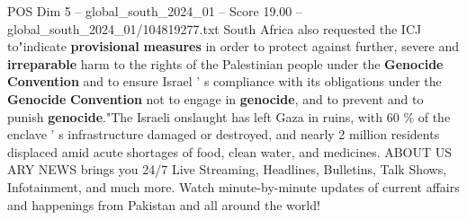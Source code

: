 \begin{textsample}{POS Dim 5 – global\_south\_2024\_01 – Score 19.00 – global\_south\_2024\_01/104819277.txt}
South Africa also requested the ICJ to"indicate \textbf{provisional} \textbf{measures} in order to protect against further, severe and \textbf{irreparable} harm to the rights of the Palestinian people under the \textbf{Genocide} \textbf{Convention} and to ensure Israel ' s compliance with its obligations under the \textbf{Genocide} \textbf{Convention} not to engage in \textbf{genocide}, and to prevent and to punish \textbf{genocide}."The Israeli onslaught has left Gaza in ruins, with 60 \% of the enclave ' s infrastructure damaged or destroyed, and nearly 2 million residents displaced amid acute shortages of food, clean water, and medicines.
ABOUT US ARY NEWS brings you 24/7 Live Streaming, Headlines, Bulletins, Talk Shows, Infotainment, and much more.
Watch minute-by-minute updates of current affairs and happenings from Pakistan and all around the world!

\end{textsample}
